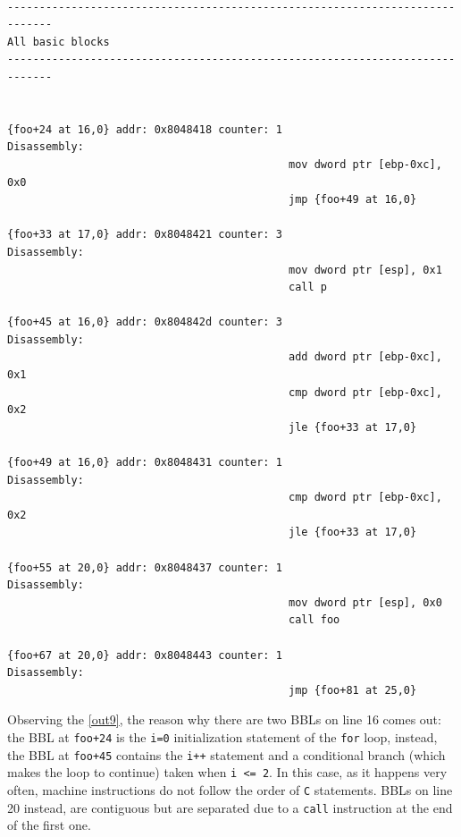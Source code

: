 \documentclass[a4paper,10pt]{report}
\begin{document}
\begin{lstlisting}[language={[x86masm]Assembler}, 
	label=out9, caption={a part of ``all basic blocks'' table}, frame=bottomline]

-----------------------------------------------------------------------------
All basic blocks
-----------------------------------------------------------------------------


{foo+24 at 16,0} addr: 0x8048418 counter: 1	
Disassembly: 
											mov dword ptr [ebp-0xc], 0x0
											jmp {foo+49 at 16,0}

{foo+33 at 17,0} addr: 0x8048421 counter: 3	
Disassembly: 
											mov dword ptr [esp], 0x1
											call p

{foo+45 at 16,0} addr: 0x804842d counter: 3	
Disassembly: 
											add dword ptr [ebp-0xc], 0x1
											cmp dword ptr [ebp-0xc], 0x2
											jle {foo+33 at 17,0}

{foo+49 at 16,0} addr: 0x8048431 counter: 1	
Disassembly: 
											cmp dword ptr [ebp-0xc], 0x2
											jle {foo+33 at 17,0}

{foo+55 at 20,0} addr: 0x8048437 counter: 1	
Disassembly: 
											mov dword ptr [esp], 0x0
											call foo

{foo+67 at 20,0} addr: 0x8048443 counter: 1	
Disassembly: 
											jmp {foo+81 at 25,0}

\end{lstlisting}

Observing the \cref{out9}, the reason why there are two BBLs on line 16 comes out:
the BBL at \verb|foo+24| is the \verb|i=0| initialization statement 
of the \verb|for| loop, instead, the BBL at \verb|foo+45| contains the \verb|i++| statement and a conditional branch (which makes the loop to continue) taken when
\verb|i <= 2|. In this case, as it happens very often, machine instructions 
do not follow the order of \verb|C| statements. BBLs on line 20 instead, are contiguous
but are separated due to a \verb|call| instruction at the end of the first one.
\end{document}
